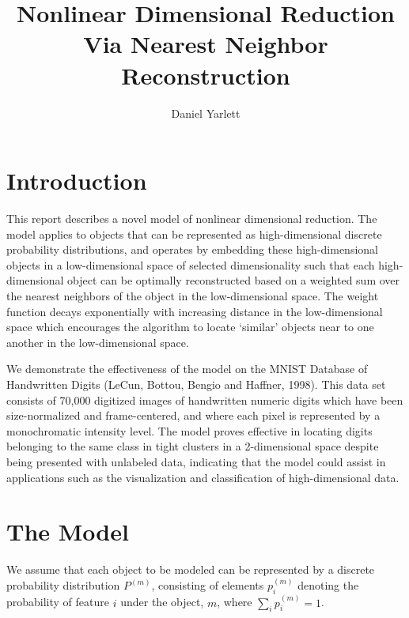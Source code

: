 \documentclass[11pt]{article} %
\title{Nonlinear Dimensional Reduction Via Nearest Neighbor Reconstruction}
\author{Daniel Yarlett}
\date{}
\begin{document}
\maketitle

\section{Introduction}

This report describes a novel model of nonlinear dimensional reduction. The model applies to objects that can be represented as high-dimensional discrete probability distributions, and operates by embedding these high-dimensional objects in a low-dimensional space of selected dimensionality such that each high-dimensional object can be optimally reconstructed based on a weighted sum over the nearest neighbors of the object in the low-dimensional space. The weight function decays exponentially with increasing distance in the low-dimensional space which encourages the algorithm to locate `similar' objects near to one another in the low-dimensional space.

We demonstrate the effectiveness of the model on the MNIST Database of Handwritten Digits (LeCun, Bottou, Bengio and Haffner, 1998). This data set consists of 70,000 digitized images of handwritten numeric digits which have been size-normalized and frame-centered, and where each pixel is represented by a monochromatic intensity level. The model proves effective in locating digits belonging to the same class in tight clusters in a 2-dimensional space despite being presented with unlabeled data, indicating that the model could assist in applications such as the visualization and classification of high-dimensional data.

\section{The Model}

We assume that each object to be modeled can be represented by a discrete probability distribution $P^{(m)}$, consisting of elements $p^{(m)}_i$ denoting the probability of feature $i$ under the object, $m$, where $\sum_i p^{(m)}_i=1$.
\end{document}
